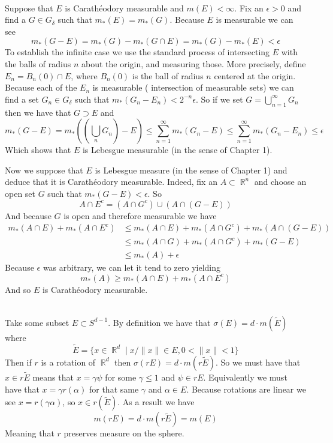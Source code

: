 \documentclass{article}
\DeclareMathOperator{\R}{\mathbb{R}}
\DeclareMathOperator{\suchthat}{\mathrel{|}}
\newcommand{\problem}[1]{\noindent{\textbf{Problem #1}}\\}
\begin{document}
\problem{6.7.3} Suppose that $E$ is Carath\'{e}odory measurable and $m(E) < \infty$. Fix an $\epsilon > 0$ and find a $G \in G_\delta$ such that $m_*(E) = m_*(G)$. Because $E$ is measurable we can see
\[
m_*(G - E) = m_*(G) - m_*(G \cap E)= m_*(G) - m_*(E) < \epsilon
\]
To establish the infinite case we use the standard process of intersecting $E$ with the balls of radius $n$ about the origin, and measuring those. More precisely, define $E_n = B_n(0) \cap E$, where $B_n(0)$ is the ball of radius $n$ centered at the origin. Because each of the $E_n$ is measurable ( intersection of measurable sets) we can find a set $G_n \in G_\delta$ such that $m_*(G_n - E_n) < 2^{-n}\epsilon$. So if we set $G = \bigcup_{n=1}^\infty G_n$ then we have that $G \supset E$ and
\[
m_*(G - E) = m_*\left(\left(\bigcup_n G_n\right) - E\right) \leq \sum_{n=1}^\infty m_*(G_n - E) \leq \sum_{n=1}^\infty m_*(G_n - E_n) \leq \epsilon
\] 
Which shows that $E$ is Lebesgue measurable (in the sense of Chapter 1).

Now we suppose that $E$ is Lebesgue measure (in the sense of Chapter 1) and deduce that it is Carath\'{e}odory measurable. Indeed, fix an $A \subset \R^n$ and choose an open set $G$ such that $m_*(G - E) < \epsilon$. So 
\[
A \cap E^c = (A \cap G^c) \cup (A \cap (G - E))
\]
And because $G$ is open and therefore measurable we have
\begin{align*}
m_*(A \cap E) + m_*(A \cap E^c) &\leq m_*(A \cap E) + m_*(A \cap G^c) + m_*(A \cap (G - E)) \\
&\leq m_*(A \cap G) + m_*(A \cap G^c) + m_*(G - E) \\
&\leq m_*(A) + \epsilon
\end{align*}
Because $\epsilon$ was arbitrary, we can let it tend to zero yielding
\[
m_*(A) \geq m_*(A \cap E) + m_*(A \cap E^c)
\]
And so $E$ is Carath\'{e}odory measurable.

\problem{6.7.4} Take some subset $E \subset S^{d - 1}$. By definition we have that $\sigma(E) = d \cdot m(\tilde{E})$ where 
\[
\tilde{E} = \{x \in \R^d \suchthat x/\|x\| \in E, 0 < \|x\| < 1\}
\]
Then if $r$ is a rotation of $\R^d$ then $\sigma(rE) = d\cdot m(r\tilde{E})$. So we must have that $x \in r\tilde{E}$ means that $x = \gamma\psi$ for some $\gamma \leq 1$ and $\psi \in rE$. Equivalently we must have that $x = \gamma r(\alpha)$ for that same $\gamma$ and $\alpha \in E$. Because rotations are linear we see $x = r(\gamma\alpha)$, so $x \in r(\tilde{E})$. As a result we have
\[
m(rE) = d\cdot m(r\tilde{E}) = m(E)
\]
Meaning that $r$ preserves measure on the sphere. 
\end{document}
